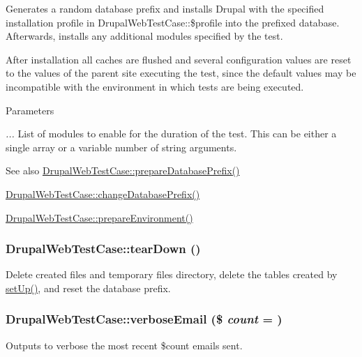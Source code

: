 Generates a random database prefix and installs Drupal with the specified installation profile in DrupalWebTestCase::\$profile into the prefixed database. Afterwards, installs any additional modules specified by the test.

After installation all caches are flushed and several configuration values are reset to the values of the parent site executing the test, since the default values may be incompatible with the environment in which tests are being executed.


\begin{DoxyParams}{Parameters}
\item[{\em ...}]List of modules to enable for the duration of the test. This can be either a single array or a variable number of string arguments.\end{DoxyParams}
\begin{DoxySeeAlso}{See also}
\hyperlink{classDrupalWebTestCase_ab0d1446330ac8178c8baefcd5cfa677c}{DrupalWebTestCase::prepareDatabasePrefix()} 

\hyperlink{classDrupalWebTestCase_aaf79c7de4222e244e8b6b6228ba1278f}{DrupalWebTestCase::changeDatabasePrefix()} 

\hyperlink{classDrupalWebTestCase_aafa7fa69ee28fd661c23edbc4f6766ac}{DrupalWebTestCase::prepareEnvironment()} 
\end{DoxySeeAlso}
\hypertarget{classDrupalWebTestCase_a6c0dba3c89c4aab3fa2576857c6f2be1}{
\subsubsection[{tearDown}]{\setlength{\rightskip}{0pt plus 5cm}DrupalWebTestCase::tearDown ()}}
\label{classDrupalWebTestCase_a6c0dba3c89c4aab3fa2576857c6f2be1}
Delete created files and temporary files directory, delete the tables created by \hyperlink{classDrupalWebTestCase_a110ecf5deb57ee6a908617360c1f6ec4}{setUp()}, and reset the database prefix. \hypertarget{classDrupalWebTestCase_a5b95ca547399234a008fe0aabd7ba830}{
\subsubsection[{verboseEmail}]{\setlength{\rightskip}{0pt plus 5cm}DrupalWebTestCase::verboseEmail (\$ {\em count} = {})}}
\label{classDrupalWebTestCase_a5b95ca547399234a008fe0aabd7ba830}
Outputs to verbose the most recent \$count emails sent.


